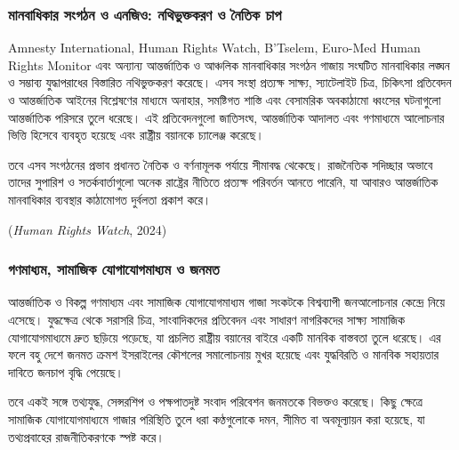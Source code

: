 \subsubsection{মানবাধিকার সংগঠন ও এনজিও: নথিভুক্তকরণ ও নৈতিক
চাপ}\label{ux9aeux9a8ux9acux9a7ux995ux9b0-ux9b8ux997ux9a0ux9a8-ux993-ux98fux9a8ux99cux993-ux9a8ux9a5ux9adux995ux9a4ux995ux9b0ux9a3-ux993-ux9a8ux9a4ux995-ux99aux9aa}

Amnesty International, Human Rights Watch, B'Tselem, Euro-Med Human
Rights Monitor এবং অন্যান্য আন্তর্জাতিক ও আঞ্চলিক মানবাধিকার সংগঠন গাজায়
সংঘটিত মানবাধিকার লঙ্ঘন ও সম্ভাব্য যুদ্ধাপরাধের বিস্তারিত নথিভুক্তকরণ করেছে। এসব
সংস্থা প্রত্যক্ষ সাক্ষ্য, স্যাটেলাইট চিত্র, চিকিৎসা প্রতিবেদন ও আন্তর্জাতিক আইনের
বিশ্লেষণের মাধ্যমে অনাহার, সমষ্টিগত শাস্তি এবং বেসামরিক অবকাঠামো ধ্বংসের
ঘটনাগুলো আন্তর্জাতিক পরিসরে তুলে ধরেছে। এই প্রতিবেদনগুলো জাতিসংঘ, আন্তর্জাতিক
আদালত এবং গণমাধ্যমে আলোচনার ভিত্তি হিসেবে ব্যবহৃত হয়েছে এবং রাষ্ট্রীয় বয়ানকে
চ্যালেঞ্জ করেছে।

তবে এসব সংগঠনের প্রভাব প্রধানত নৈতিক ও বর্ণনামূলক পর্যায়ে সীমাবদ্ধ থেকেছে।
রাজনৈতিক সদিচ্ছার অভাবে তাদের সুপারিশ ও সতর্কবার্তাগুলো অনেক রাষ্ট্রের নীতিতে
প্রত্যক্ষ পরিবর্তন আনতে পারেনি, যা আবারও আন্তর্জাতিক মানবাধিকার ব্যবস্থার
কাঠামোগত দুর্বলতা প্রকাশ করে।

(\emph{Human Rights Watch}, 2024)

\vspace{0.3em}

\subsubsection{গণমাধ্যম, সামাজিক যোগাযোগমাধ্যম ও
জনমত}\label{ux997ux9a3ux9aeux9a7ux9afux9ae-ux9b8ux9aeux99cux995-ux9afux997ux9afux997ux9aeux9a7ux9afux9ae-ux993-ux99cux9a8ux9aeux9a4}

আন্তর্জাতিক ও বিকল্প গণমাধ্যম এবং সামাজিক যোগাযোগমাধ্যম গাজা সংকটকে বিশ্বব্যাপী
জনআলোচনার কেন্দ্রে নিয়ে এসেছে। যুদ্ধক্ষেত্র থেকে সরাসরি চিত্র, সাংবাদিকদের
প্রতিবেদন এবং সাধারণ নাগরিকদের সাক্ষ্য সামাজিক যোগাযোগমাধ্যমে দ্রুত ছড়িয়ে
পড়েছে, যা প্রচলিত রাষ্ট্রীয় বয়ানের বাইরে একটি মানবিক বাস্তবতা তুলে ধরেছে। এর
ফলে বহু দেশে জনমত ক্রমশ ইসরাইলের কৌশলের সমালোচনায় মুখর হয়েছে এবং যুদ্ধবিরতি ও
মানবিক সহায়তার দাবিতে জনচাপ বৃদ্ধি পেয়েছে।

তবে একই সঙ্গে তথ্যযুদ্ধ, সেন্সরশিপ ও পক্ষপাতদুষ্ট সংবাদ পরিবেশন জনমতকে বিভক্তও
করেছে। কিছু ক্ষেত্রে সামাজিক যোগাযোগমাধ্যমে গাজার পরিস্থিতি তুলে ধরা কণ্ঠগুলোকে
দমন, সীমিত বা অবমূল্যায়ন করা হয়েছে, যা তথ্যপ্রবাহের রাজনীতিকরণকে স্পষ্ট করে।

